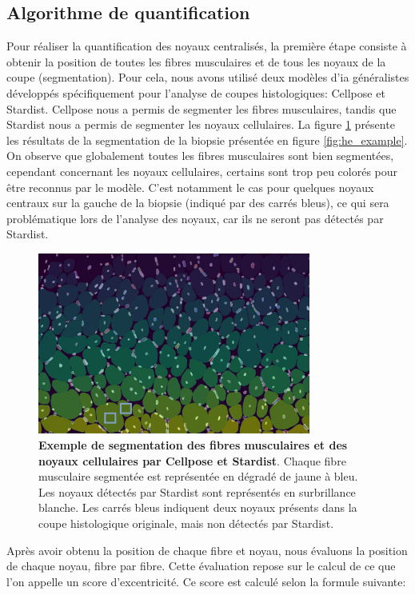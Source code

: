\subsection{Algorithme de quantification}
Pour réaliser la quantification des noyaux centralisés, la première étape consiste à obtenir la position de toutes les fibres musculaires et de tous les noyaux de la coupe (segmentation). Pour cela, nous avons utilisé deux modèles d'\gls{ia} généralistes développés spécifiquement pour l'analyse de coupes histologiques: Cellpose et Stardist. Cellpose nous a permis de segmenter les fibres musculaires, tandis que Stardist nous a permis de segmenter les noyaux cellulaires. La figure \ref{fig:he_seg} présente les résultats de la segmentation de la biopsie présentée en figure \ref{fig:he_example}. On observe que globalement toutes les fibres musculaires sont bien segmentées, cependant concernant les noyaux cellulaires, certains sont trop peu colorés pour être reconnus par le modèle. C'est notamment le cas pour quelques noyaux centraux sur la gauche de la biopsie (indiqué par des carrés bleus), ce qui sera problématique lors de l'analyse des noyaux, car ils ne seront pas détectés par Stardist.
\begin{figure}[!htbp]
 \centering
 \includegraphics[width=0.8\textwidth]{figures/he_seg.png}
 \caption[Exemple de segmentation de biopsie par Cellpose et Stardist]{\textbf{Exemple de segmentation des fibres musculaires et des noyaux cellulaires par Cellpose et Stardist}. Chaque fibre musculaire segmentée est représentée en dégradé de jaune à bleu. Les noyaux détectés par Stardist sont représentés en surbrillance blanche. Les carrés bleus indiquent deux noyaux présents dans la coupe histologique originale, mais non détectés par Stardist.}
 \label{fig:he_seg}
\end{figure}

Après avoir obtenu la position de chaque fibre et noyau, nous évaluons la position de chaque noyau, fibre par fibre. Cette évaluation repose sur le calcul de ce que l'on appelle un score d'excentricité. Ce score est calculé selon la formule suivante:

